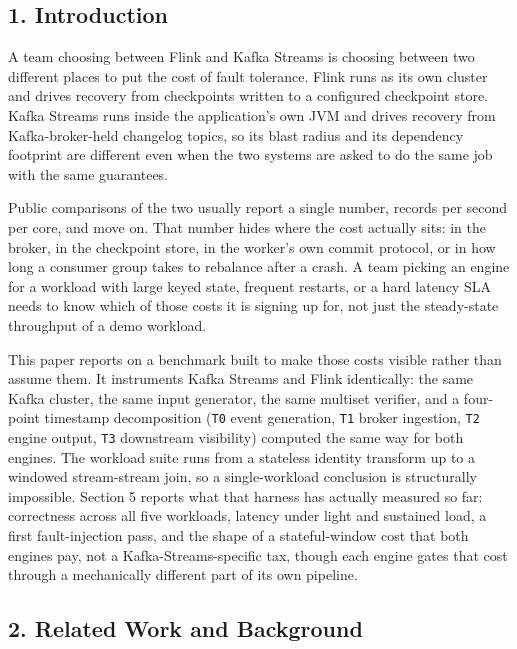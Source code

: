 \documentclass[
]{article}
\begin{document}
\hypertarget{introduction}{%
\subsection{1. Introduction}\label{introduction}}

A team choosing between Flink and Kafka Streams is choosing between two
different places to put the cost of fault tolerance. Flink runs as its
own cluster and drives recovery from checkpoints written to a configured
checkpoint store. Kafka Streams runs inside the application's own JVM
and drives recovery from Kafka-broker-held changelog topics, so its
blast radius and its dependency footprint are different even when the
two systems are asked to do the same job with the same guarantees.

Public comparisons of the two usually report a single number, records
per second per core, and move on. That number hides where the cost
actually sits: in the broker, in the checkpoint store, in the worker's
own commit protocol, or in how long a consumer group takes to rebalance
after a crash. A team picking an engine for a workload with large keyed
state, frequent restarts, or a hard latency SLA needs to know which of
those costs it is signing up for, not just the steady-state throughput
of a demo workload.

This paper reports on a benchmark built to make those costs visible
rather than assume them. It instruments Kafka Streams and Flink
identically: the same Kafka cluster, the same input generator, the same
multiset verifier, and a four-point timestamp decomposition (\texttt{T0}
event generation, \texttt{T1} broker ingestion, \texttt{T2} engine
output, \texttt{T3} downstream visibility) computed the same way for
both engines. The workload suite runs from a stateless identity
transform up to a windowed stream-stream join, so a single-workload
conclusion is structurally impossible. Section 5 reports what that
harness has actually measured so far: correctness across all five
workloads, latency under light and sustained load, a first
fault-injection pass, and the shape of a stateful-window cost that both
engines pay, not a Kafka-Streams-specific tax, though each engine gates
that cost through a mechanically different part of its own pipeline.

\hypertarget{related-work-and-background}{%
\subsection{2. Related Work and
Background}\label{related-work-and-background}}
\end{document}
